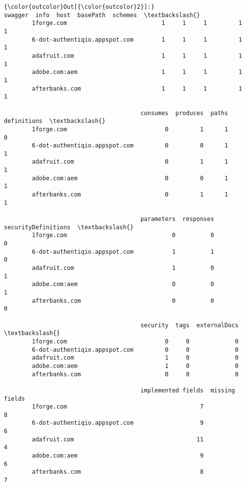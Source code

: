 \documentclass[11pt]{article}
\begin{document}
\begin{Verbatim}[commandchars=\\\{\}]
{\color{outcolor}Out[{\color{outcolor}2}]:}                                swagger  info  host  basePath  schemes  \textbackslash{}
        1forge.com                           1     1     1         1        1   
        6-dot-authentiqio.appspot.com        1     1     1         1        1   
        adafruit.com                         1     1     1         1        1   
        adobe.com:aem                        1     1     1         1        1   
        afterbanks.com                       1     1     1         1        1   
        
                                       consumes  produces  paths  definitions  \textbackslash{}
        1forge.com                            0         1      1            0   
        6-dot-authentiqio.appspot.com         0         0      1            1   
        adafruit.com                          0         1      1            1   
        adobe.com:aem                         0         0      1            1   
        afterbanks.com                        0         1      1            1   
        
                                       parameters  responses  securityDefinitions  \textbackslash{}
        1forge.com                              0          0                    0   
        6-dot-authentiqio.appspot.com           1          1                    0   
        adafruit.com                            1          0                    1   
        adobe.com:aem                           0          0                    1   
        afterbanks.com                          0          0                    0   
        
                                       security  tags  externalDocs  \textbackslash{}
        1forge.com                            0     0             0   
        6-dot-authentiqio.appspot.com         0     0             0   
        adafruit.com                          1     0             0   
        adobe.com:aem                         1     0             0   
        afterbanks.com                        0     0             0   
        
                                       implemented fields  missing fields  
        1forge.com                                      7               8  
        6-dot-authentiqio.appspot.com                   9               6  
        adafruit.com                                   11               4  
        adobe.com:aem                                   9               6  
        afterbanks.com                                  8               7  
\end{Verbatim}
            
\end{document}
